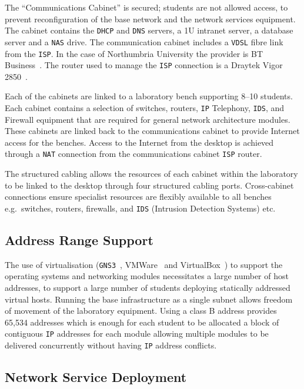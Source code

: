 \documentclass{llncs}
\begin{document}
The ``Communications Cabinet'' is secured; students are not allowed access, to
prevent reconfiguration of the base network and the network services equipment.
The cabinet contains the \texttt{DHCP} and \texttt{DNS} servers, a 1U intranet
server, a database server and a \texttt{NAS} drive. The communication cabinet
includes a \texttt{VDSL} fibre link from the \texttt{ISP}. In the case of
Northumbria University the provider is BT Business~\cite{BT:17}. The router
used to manage the \texttt{ISP} connection is a Draytek Vigor
2850~\cite{DC:17}.

Each of the cabinets are linked to a laboratory bench supporting 8--10
students. Each cabinet contains a selection of switches, routers, \texttt{IP}
Telephony, \texttt{IDS}, and Firewall equipment that are required for general
network architecture modules. These cabinets are linked back to the
communications cabinet to provide Internet access for the benches. Access to
the Internet from the desktop is achieved through a \texttt{NAT} connection
from the communications cabinet \texttt{ISP} router.

The structured cabling allows the resources of each cabinet within the
laboratory to be linked to the desktop through four structured cabling ports.
Cross-cabinet connections ensure specialist resources are flexibly available to
all benches e.g.\ switches, routers, firewalls, and \texttt{IDS} (Intrusion
Detection Systems) etc.

\subsection{Address Range Support}

The use of virtualisation (\texttt{GNS3}~\cite{GNS3:17},
VMWare~\cite{VMWARE:17} and VirtualBox~\cite{O:17}) to support the operating
systems and networking modules necessitates a large number of host addresses,
to support a large number of students deploying statically addressed virtual
hosts. Running the base infrastructure as a single subnet allows freedom of
movement of the laboratory equipment. Using a class B address provides 65,534
addresses which is enough for each student to be allocated a block of
contiguous \texttt{IP} addresses for each module allowing multiple modules to
be delivered concurrently without having \texttt{IP} address conflicts.

\subsection{Network Service Deployment}\label{InfraService}
\end{document}
